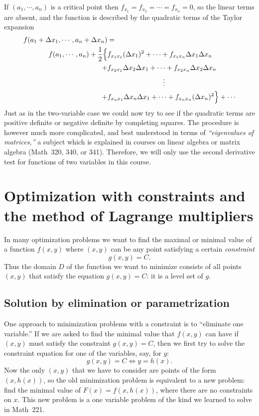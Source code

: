 If $(a_1, \cdots, a_n)$ is a critical point then $f_{x_1} = f_{x_2} = \cdots =
f_{x_n} = 0$, so the linear terms are absent, and the function is described by
the quadratic terms of the Taylor expansion
\begin{align*}
  f(a_1+\Delta x_1, \cdots, a_n+\Delta x_n)& = \\
  f(a_1, \cdots, a_n) +\frac12\Bigl\{
  &f_{x_1x_1} (\Delta x_1)^2 + \cdots + f_{x_1x_n}\Delta x_1\Delta x_n \\
  +&f_{x_2x_1}\Delta x_2\Delta x_1 +\cdots + f_{x_2x_n}\Delta x_2\Delta x_n \\
  &\hspace{8em}\vdots\\
  +&f_{x_nx_1}\Delta x_n\Delta x_1 +\cdots + f_{x_nx_n}(\Delta x_n)^2 \Bigr\} +
  \cdots
\end{align*}
Just as in the two-variable case we could now try to see if the quadratic terms
are positive definite or negative definite by completing squares.  The procedure
is however much more complicated, and best understood in terms of
\textit{``eigenvalues of matrices,''} a subject which is explained in courses on
linear algebra or matrix algebra (Math~320, 340, or 341).  Therefore, we will
only use the second derivative test for functions of two variables in this
course.


\section{Optimization with constraints and the method of Lagrange multipliers}
In many optimization problems we want to find the maximal or minimal value of a
function $f(x, y)$ where $(x, y)$ can be any point satisfying a certain
\emph{constraint}
\begin{equation}
  g(x, y) = C.
  \label{eq:03the-constraint}
\end{equation}
Thus the domain $D$ of the function we want to minimize consists of all points $(x,
y)$ that satisfy the equation $g(x,y) = C$: it is a level set of $g$.

\subsection{Solution by elimination or parametrization}
One approach to minimization problems with a constraint is to ``eliminate one
variable.''  If we are asked to find the minimal value that $f(x,y)$ can have if
$(x, y)$ must satisfy the constraint $g(x, y)=C$, then we first try to solve the
constraint equation for one of the variables, say, for $y$:
\[
g(x, y) = C \iff y=h(x).
\]
Now the only $(x, y)$ that we have to consider are points of the form $(x, h(x))$,
so the old minimization problem is equivalent to a new problem: find the minimal
value of $F(x) = f(x, h(x))$, where there are no constraints on $x$.  This new
problem is a one variable problem of the kind we learned to solve in Math~221.

